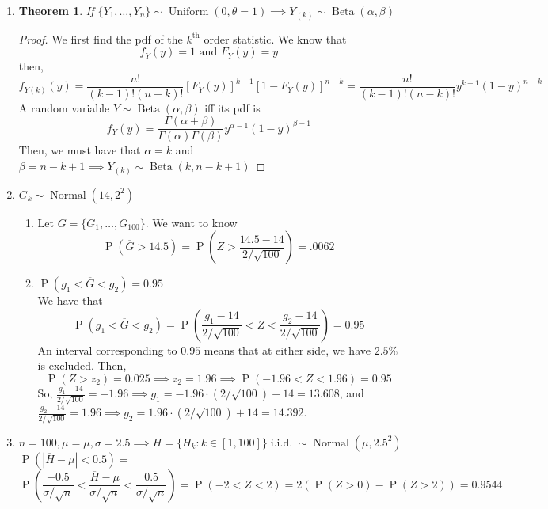 \documentclass{article}
\newcommand{\set}[1]{\{#1\}}
\newcommand{\pr}[1]{\operatorname{P}\left(#1\right)}
\newcommand{\iid}{\operatorname{i.i.d.}}
\newcommand{\unidist}[3]{#1 \sim \operatorname{Uniform}(#2, #3)}
\newcommand{\normdist}[3]{#1 \sim \operatorname{Normal}(#2, #3)}
\newcommand{\betdist}[3]{#1 \sim \operatorname{Beta}(#2, #3)}
\newtheorem*{theorem}{Theorem}
\begin{document}
\begin{enumerate}
  \item \begin{theorem}
    If $\unidist{\set{Y_1, \ldots , Y_n}}{0}{\theta = 1} \implies \betdist{Y_{(k)}}{\alpha}{\beta}$
  \end{theorem}
  \begin{proof}
    We first find the pdf of the $k^{\text{th}}$ order statistic. We know that
    \[
      f_Y(y) = 1 \text{ and } F_Y(y) = y
    \]
    then,
    \[
      f_{Y(k)}(y) = \frac{n!}{(k-1)!(n-k)!}\left[F_Y(y)\right]^{k-1}\left[ 1-F_Y(y) \right]^{n-k}
      = \frac{n!}{(k-1)!(n-k)!}y^{k-1}\left( 1-y \right)^{n-k}
    \]
    A random variable $\betdist{Y}{\alpha}{\beta}$
    iff its pdf is \[
      f_Y(y) = \frac{\Gamma(\alpha + \beta)}{\Gamma(\alpha)\Gamma(\beta)}y^{\alpha - 1}(1-y)^{\beta - 1}
    \]
    Then, we must have that $\alpha = k$ and $\beta = n-k+1 \implies \betdist{Y_{(k)}}{k}{n-k+1}$
  \end{proof}

  \item $\normdist{G_k}{14}{2^2}$
  \begin{enumerate}
    \item Let $G = \set{G_1, \ldots, G_{100}}$.
    We want to know \[
      \pr{\overline{G} > 14.5} = \pr{Z > \frac{14.5 - 14}{2/\sqrt{100}}} = .0062 
    \]
    \item $\pr{g_1 <\overline{G} < g_2} = 0.95$\\
    We have that
    \[
      \pr{g_1 <\overline{G} < g_2} = \pr{\frac{g_1 - 14}{2/\sqrt{100}} < Z < \frac{g_2 - 14}{2/\sqrt{100}}} = 0.95
    \]
    An interval corresponding to $0.95$ means that at either side, we have $2.5\%$ is excluded. Then, \[
      \pr{Z > z_2} = 0.025 \implies z_2 = 1.96 \implies \pr{-1.96 < Z < 1.96} = 0.95
    \]
    So, $\frac{g_1 - 14}{2/\sqrt{100}} = -1.96 \implies g_1 = -1.96\cdot(2/\sqrt{100})+14 = 13.608$, and\\
    $\frac{g_2 - 14}{2/\sqrt{100}} = 1.96 \implies g_2 = 1.96\cdot(2/\sqrt{100})+14 = 14.392$.
  \end{enumerate}

  \item $n = 100, \mu = \mu,\sigma = 2.5 
  \implies H=\normdist{\set{H_k: k\in [1,100]} \iid }{\mu}{2.5^2}$\\
  $\pr{|\overline{H} - \mu| < 0.5} = $ \[
    \pr{\frac{-0.5}{\sigma/\sqrt{n}} < \frac{\overline{H} - \mu}{\sigma/\sqrt{n}} < \frac{0.5}{\sigma/\sqrt{n}}} 
    = \pr{-2 < Z < 2} = 2(\pr{Z > 0} - \pr{Z > 2}) = 0.9544
  \]


\end{enumerate}
\end{document}
